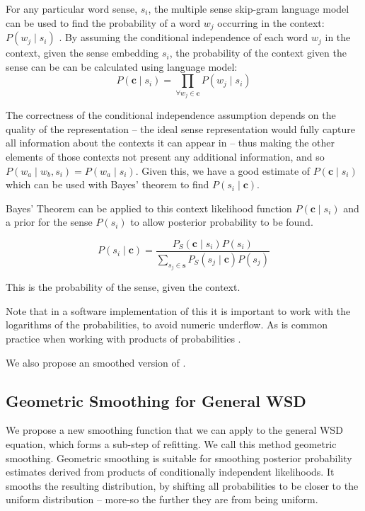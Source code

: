 \documentclass{sig-alternate}
\renewcommand{\c}{\mathbf{c}}
\newcommand{\s}{\mathbf{s}}
\begin{document}
For any particular word sense, $s_i$, the multiple sense skip-gram language model can be used to
find the probability of a word $w_j$ occurring in the context: $P(w_j \mid s_i)$
\parencite{tian2014probabilistic,AdaGrams}.
By assuming the conditional independence of each word $w_j$ in the context, given the sense embedding $s_i$, the probability of the context given the sense can be can be calculated using language model:
\begin{equation} \label{eq:contextprobtrue}
P(\c \mid s_{i})=\prod_{\forall w_{j}\in\c}P(w_{j} \mid s_{i})
\end{equation}

The correctness of the conditional independence assumption depends on the quality of the representation -- the ideal sense representation would fully capture all information about the contexts it can appear in -- thus making the other elements of those contexts not present any additional information, and so  $P(w_a \mid w_b,s_i)=P(w_a \mid s_i)$. Given this, we have a good estimate of $P(\c \mid s_{i})$ which can be used with Bayes' theorem to find $P( s_i \mid \c)$.


Bayes' Theorem can be applied to this context likelihood function  $P(\c \mid s_{i})$ and a prior for the sense $P(s_i)$ to allow posterior probability to be found.

\begin{equation} \label{eq:generalwsd}
P(s_{i} \mid \c) =
\dfrac{P_S(\c \mid s_{i})P(s_{i})}
{\sum_{s_{j}\in\s} P_S(s_{j} \mid \c)P(s_{j})}
\end{equation}

This is the probability of the sense, given the context.

Note that in a  software implementation of this it is important to work with the logarithms of the probabilities, to avoid numeric underflow. As is common practice when working with products of probabilities \parencite{press2007numerical}.

We also propose an smoothed version of .

\subsection{Geometric Smoothing for General WSD} \label{smoothing}
We propose a new smoothing function that we can apply to the general WSD equation, which forms a sub-step of refitting.
We call this method geometric smoothing.
Geometric smoothing is suitable for smoothing posterior probability estimates derived from products of conditionally independent likelihoods.
It smooths the resulting distribution, by shifting all probabilities to be closer to the uniform distribution -- more-so the further they are from being uniform.
\end{document}

